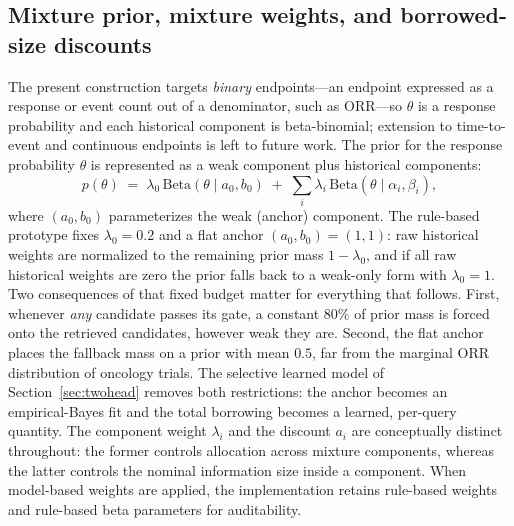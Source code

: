 \documentclass[11pt]{article}
\newcommand{\lamz}{\lambda_{0}}
\begin{document}
\subsection{Mixture prior, mixture weights, and borrowed-size discounts}
\label{sec:mixture}
The present construction targets \emph{binary} endpoints---an endpoint expressed
as a response or event count out of a denominator, such as ORR---so $\theta$ is
a response probability and each historical component is beta-binomial;
extension to time-to-event and continuous endpoints is left to future work. The
prior for the response probability $\theta$ is represented as a weak
component plus historical components:
\begin{equation}
p(\theta) \;=\; \lamz\,\mathrm{Beta}(\theta\mid a_0,b_0)
\;+\; \sum_i \lambda_i\,\mathrm{Beta}(\theta\mid \alpha_i,\beta_i),
\end{equation}
where $(a_0, b_0)$ parameterizes the weak (anchor) component. The rule-based
prototype fixes $\lamz = 0.2$ and a flat anchor
$(a_0,b_0) = (1,1)$: raw historical weights are normalized to the remaining
prior mass $1-\lamz$, and if all raw historical weights are zero the prior
falls back to a weak-only form with $\lamz = 1$. Two consequences of that
fixed budget matter for everything that follows. First, whenever \emph{any}
candidate passes its gate, a constant $80\%$ of prior mass is forced onto the
retrieved candidates, however weak they are. Second, the flat anchor places
the fallback mass on a prior with mean $0.5$, far from the marginal ORR
distribution of oncology trials. The selective learned model of
Section~\ref{sec:twohead} removes both restrictions: the anchor becomes an
empirical-Bayes fit and the total borrowing becomes a learned, per-query
quantity. The component weight $\lambda_i$ and the
discount $a_i$ are conceptually distinct throughout: the former controls
allocation across mixture components, whereas the latter controls the nominal
information size inside a component. When model-based weights are applied, the
implementation retains rule-based weights and rule-based beta parameters for
auditability.
\end{document}
